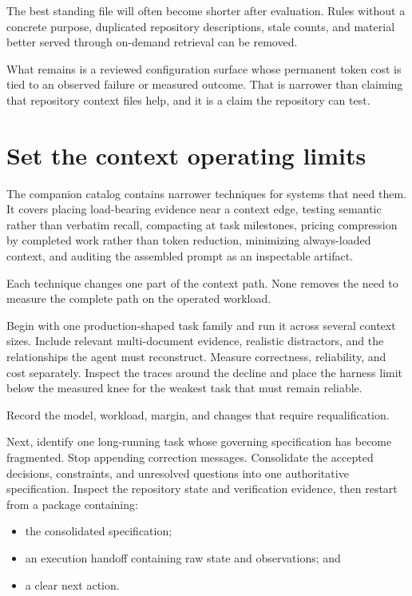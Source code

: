 The best standing file will often become shorter after evaluation. Rules without a concrete purpose, duplicated repository descriptions, stale counts, and material better served through on-demand retrieval can be removed.

What remains is a reviewed configuration surface whose permanent token cost is tied to an observed failure or measured outcome. That is narrower than claiming that repository context files help, and it is a claim the repository can test.

\section{Set the context operating limits}\label{set-the-context-operating-limits}

The companion catalog contains narrower techniques for systems that need them. It covers placing load-bearing evidence near a context edge, testing semantic rather than verbatim recall, compacting at task milestones, pricing compression by completed work rather than token reduction, minimizing always-loaded context, and auditing the assembled prompt as an inspectable artifact.

Each technique changes one part of the context path. None removes the need to measure the complete path on the operated workload.

Begin with one production-shaped task family and run it across several context sizes. Include relevant multi-document evidence, realistic distractors, and the relationships the agent must reconstruct. Measure correctness, reliability, and cost separately. Inspect the traces around the decline and place the harness limit below the measured knee for the weakest task that must remain reliable.

Record the model, workload, margin, and changes that require requalification.

Next, identify one long-running task whose governing specification has become fragmented. Stop appending correction messages. Consolidate the accepted decisions, constraints, and unresolved questions into one authoritative specification. Inspect the repository state and verification evidence, then restart from a package containing:

\begin{itemize}
\tightlist
\item
  the consolidated specification;
\item
  an execution handoff containing raw state and observations; and
\item
  a clear next action.
\end{itemize}

